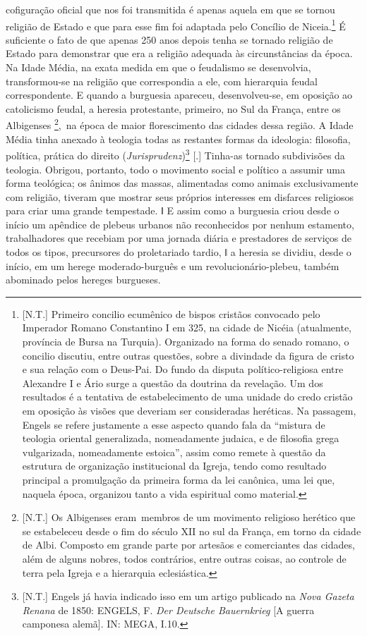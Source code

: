 cofiguração oficial que nos foi transmitida é apenas aquela em que se
tornou religião de Estado e que para esse fim foi adaptada pelo Concílio
de Niceia\protect\hypertarget{n199}{}{}.\footnote{{[}N.T.{]} Primeiro
  concilio ecumênico de bispos cristãos convocado pelo Imperador Romano
  Constantino I em 325, na cidade de Nicéia (atualmente, província de
  Bursa na Turquia). Organizado na forma do senado romano, o concilio
  discutiu, entre outras questões, sobre a divindade da figura de cristo
  e sua relação com o Deus-Pai. Do fundo da disputa político-religiosa
  entre Alexandre I e Ário surge a questão da doutrina da revelação. Um
  dos resultados é a tentativa de estabelecimento de uma unidade do
  credo cristão em oposição às visões que deveriam ser consideradas
  heréticas. Na passagem, Engels se refere justamente a esse aspecto
  quando fala da ``mistura de teologia oriental generalizada,
  nomeadamente judaica, e de filosofia grega vulgarizada, nomeadamente
  estoica'', assim como remete à questão da estrutura de organização
  institucional da Igreja, tendo como resultado principal a promulgação
  da primeira forma da lei canônica, uma lei que, naquela época,
  organizou tanto a vida espiritual como material.} É suficiente o fato
de que apenas 250 anos depois tenha se tornado religião de Estado para
demonstrar que era a religião adequada às circunstâncias da época. Na
Idade Média, na exata medida em que o feudalismo se desenvolvia,
transformou-se na religião que correspondia a ele, com hierarquia feudal
correspondente. E quando a burguesia apareceu, desenvolveu-se, em
oposição ao catolicismo feudal, a heresia protestante, primeiro, no Sul
da França, entre os Albigenses \footnote{{[}N.T.{]} Os Albigenses
  eram~membros de um movimento religioso herético que se estabeleceu
  desde o fim do século XII no sul da França, em torno da cidade de
  Albi. Composto em grande parte por artesãos e comerciantes das
  cidades, além de alguns nobres, todos contrários, entre outras coisas,
  ao controle de terra pela Igreja e a hierarquia eclesiástica.},\protect\hypertarget{n200}{}{}~na
época de maior florescimento das cidades dessa região. A Idade Média
tinha anexado à teologia todas as restantes formas da ideologia:
filosofia, política, prática do direito (\emph{Jurisprudenz})\footnote{{[}N.T.{]}
  Engels já havia indicado isso em um artigo publicado na \emph{Nova
  Gazeta Renana} de 1850: ENGELS, F. \emph{Der Deutsche Bauernkrieg}
  {[}A guerra camponesa alemã{]}. IN: MEGA, I.10.} {[}.{]} Tinha-as
tornado subdivisões da teologia. Obrigou, portanto, todo o movimento
social e político a assumir uma forma teológica; os ânimos das massas,
alimentadas como animais exclusivamente com religião, tiveram que
mostrar seus próprios interesses em disfarces religiosos para criar uma
grande tempestade. ǁ E assim como a burguesia criou desde o início um
apêndice de plebeus urbanos não reconhecidos por nenhum estamento,
trabalhadores que recebiam por uma jornada diária e prestadores de
serviços de todos os tipos, precursores do proletariado tardio, ǁ a
heresia se dividiu, desde o início, em um herege moderado-burguês e um
revolucionário-plebeu, também abominado pelos hereges burgueses.


